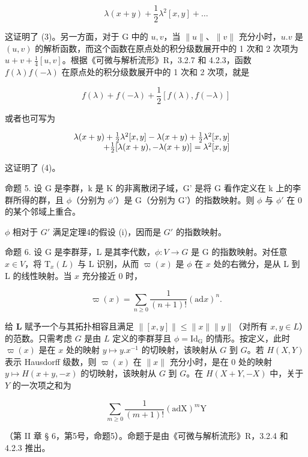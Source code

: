 \[
\lambda (x + y) + \frac {1}{2} \lambda^ {2} [ x, y ] + \dots
\]

这证明了 (3)。另一方面，对于 G 中的 \(u, v\)，当 \(\| u \|\)、\(\| v \|\) 充分小时，\(u.v\) 是 \((u, v)\) 的解析函数，而这个函数在原点处的积分级数展开中的 1 次和 2 次项为 \(u + v + \frac{1}{4}[u, v]\)。根据《可微与解析流形》R，3.2.7 和 4.2.3，函数 \(f(\lambda)f(-\lambda)\) 在原点处的积分级数展开中的 1 次和 2 次项，就是

\[
f (\lambda) + f (- \lambda) + \frac {1}{2} [ f (\lambda), f (- \lambda) ]
\]

或者也可写为

\[
\begin{array}{r l} \lambda (x + y) + \frac {1}{2} \lambda^ {2} [ x, y ] - \lambda (x + y) + \frac {1}{2} \lambda^ {2} [ x, y ] & \\ + \frac {1}{2} [ \lambda (x + y), - \lambda (x + y) ] = \lambda^ {2} [ x, y ] \end{array}
\]

这证明了 (4)。

命题 5. 设 G 是李群，k 是 K 的非离散闭子域，G' 是将 G 看作定义在 k 上的李群所得的群，且 \(\phi\)（分别为 \(\phi'\)）是 G（分别为 G'）的指数映射。则 \(\phi\) 与 \(\phi'\) 在 0 的某个邻域上重合。

\(\phi\) 相对于 \(G'\) 满足定理4的假设 (i)，因而是 \(G'\) 的指数映射。

命题 6. 设 G 是李群芽，L 是其李代数，\(\phi: V \to G\) 是 G 的指数映射。对任意 \(x \in V\)，将 \(\mathrm{T}_x(L)\) 与 L 识别，从而 \(\varpi(x)\) 是 \(\phi\) 在 \(x\) 处的右微分，是从 L 到 L 的线性映射。当 \(x\) 充分接近 0 时，

\[
\varpi (x) = \sum_ {n \geqslant 0} \frac {1}{(n + 1) !} (\mathrm{ad} x) ^ {n}.
\]

给 \(\mathbf{L}\) 赋予一个与其拓扑相容且满足 \(\| [x,y]\| \leqslant \| x\| \| y\|\)（对所有 \(x,y\in L\)）的范数。只需考虑 \(G\) 是由 \(L\) 定义的李群芽且 \(\phi = \mathrm{Id}_{\mathrm{G}}\) 的情形。按定义，此时 \(\varpi (x)\) 是在 \(x\) 处的映射 \(y\mapsto y.x^{-1}\) 的切映射，该映射从 \(G\) 到 \(G\)。若 \(H(X,Y)\) 表示 Hausdorff 级数，则 \(\varpi (x)\) 在 \(\| x\|\) 充分小时，是在 0 处的映射 \(y\mapsto H(x + y, - x)\) 的切映射，该映射从 \(G\) 到 \(G\)。在 \(H(X + Y, - X)\) 中，关于 \(Y\) 的一次项之和为

\[
\sum_ {m \geqslant 0} \frac {1}{(m + 1) !} (\mathrm{adX}) ^ {m} \mathrm{Y}
\]

（第 II 章 § 6，第5号，命题5）。命题于是由《可微与解析流形》R，3.2.4 和 4.2.3 推出。

